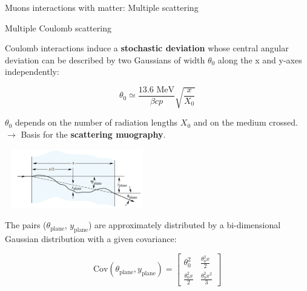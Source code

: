 \documentclass[handout,8 pt]{beamer}
\begin{document}
\begin{frame}{Muons interactions with matter: Multiple scattering}
\justifying
\begin{exampleblock}{} Multiple Coulomb scattering \end{exampleblock}
Coulomb interactions induce a \alert{\textbf{stochastic deviation}} whose central angular deviation can be described by two Gaussians of width $\theta_0$ along the x and y-axes independently:

\begin{minipage}[c]{.48\textwidth}
\begin{equation*}
\label{eq:Moliere}
\theta_0 \simeq \frac{13.6 \text{ MeV}}{\beta c p} \sqrt{\frac{x}{X_0}}
\end{equation*}

\justifying
$\theta_0$ depends on the number of radiation lengths $X_0$ and on the medium crossed. \\
\hspace{10pt} $\rightarrow$ Basis for the \textbf{\alert{scattering muography}}.
\end{minipage} \hfill
\begin{minipage}[c]{.51\textwidth}
	\includegraphics[width=6.3cm, height=2.6cm]{figs/moliere.png}
\end{minipage} \hfill \vfill

The pairs ($\theta_\text{plane}$, $y_\text{plane}$) are approximately distributed by a bi-dimensional Gaussian distribution with a given covariance:

\begin{equation*}
\text{Cov}(\theta_\text{plane}, y_\text{plane}) = \begin{bmatrix}
\theta^2_0 & \frac{\theta_0^2x}{2} \\
\frac{\theta_0^2x}{2} & \frac{\theta_0^2x^2}{3} 
\end{bmatrix}
\end{equation*} \vfill
\end{frame}
\end{document}
